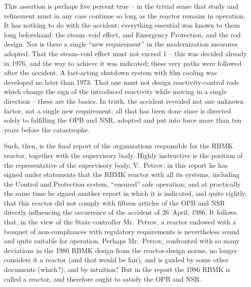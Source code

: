 \documentclass[openright]{bookest}
\begin{document}
This assertion is perhaps five percent true -- in the trivial sense that study and refinement must in any case continue so long as the reactor remains in operation. It has nothing to do with the accident; everything essential was known to them long beforehand: the steam--void effect, and Emergency Protection, and the rod design. Nor is there a single ``new requirement'' in the modernization measures adopted. That the steam-void effect must not exceed \qty{1}{\beta} -- this was decided already in 1976, and the way to achieve it was indicated; these very paths were followed after the accident. A fast-acting shutdown system with film cooling was developed no later than 1973. That one must not design reactivity-control rods which change the sign of the introduced reactivity while moving in a single direction -- these are the basics. In truth, the accident revealed not one unknown factor, not a single new requirement; all that has been done since is directed solely to fulfilling the OPB and NSR, adopted and put into force more than ten years before the catastrophe.


Such, then, is the final report of the organizations responsible for the RBMK reactor, together with the supervisory body. Highly instructive is the position of the representative of the supervisory body, V.~Petrov: in this report he has signed under statements that the RBMK reactor with all its systems, including the Control and Protection system, ``ensured'' safe operation; and at practically the same time he signed another report in which it is indicated, and quite rightly, that this reactor did not comply with fifteen articles of the OPB and NSR directly influencing the occurrence of the accident of 26~April, 1986. It follows that, in the view of the State controller Mr.~Petrov, a reactor endowed with a bouquet of non-compliances with regulatory requirements is nevertheless sound and quite suitable for operation. Perhaps Mr.~Petrov, confronted with so many deviations in the 1986 RBMK design from the reactor-design norms, no longer considers it a reactor (and that would be fair), and is guided by some other documents (which?), and by intuition? But in the report the 1986 RBMK is called a reactor, and therefore ought to satisfy the OPB and NSR.
\end{document}
